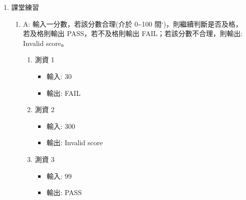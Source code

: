 \documentclass[a4paper,12pt]{article}
\begin{document}
\begin{enumerate}
\item 課堂練習
\label{sec:orgc3aa67a}
\begin{enumerate}
\item A: 輸入一分數，若該分數合理(介於 0\textasciitilde{}100 間`)，則繼續判斷是否及格，若及格則輸出 PASS，若不及格則輸出 FAIL；若該分數不合理，則輸出: Invalid score。
\label{sec:orgc59f4aa}
\begin{enumerate}
\item 測資 1
\label{sec:org95af7e4}
\begin{itemize}
\item 輸入: 30\\
\item 輸出: FAIL\\
\end{itemize}
\item 測資 2
\label{sec:org0417630}
\begin{itemize}
\item 輸入: 300\\
\item 輸出: Invalid score\\
\end{itemize}
\item 測資 3
\label{sec:orgb7f70ef}
\begin{itemize}
\item 輸入: 99\\
\item 輸出: PASS\\
\end{itemize}
\end{enumerate}
\end{enumerate}
\end{enumerate}
\end{document}
